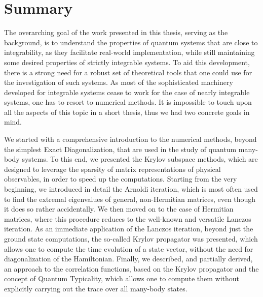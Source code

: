 \chapter{Summary}
\thispagestyle{chapterBeginStyle}


The overarching goal of the work presented in this thesis, serving as the background, is to understand the properties of
quantum systems that are close to integrability, as they facilitate real-world implementation, while
still maintaining some desired properties of strictly integrable systems.
To aid this development, there is a strong need for a robust set of theoretical tools that one
could use for the investigation of such systems. As most of the sophisticated machinery developed
for integrable systems cease to work for the case of nearly integrable systems, one has
to resort to numerical methods. It is impossible to touch upon all the aspects of this
topic in a short thesis, thus we had two concrete goals in mind.

We started with a comprehensive introduction to the numerical methods, beyond the simplest Exact
Diagonalization, that are used in the study of quantum many-body systems. To this end, we presented
the Krylov subspace methods, which are designed to leverage the sparsity of matrix representations of
physical observables, in order to speed up the computations. Starting from the very beginning, we
introduced in detail the Arnoldi iteration, which is most often used to find the extremal eigenvalues
of general, non-Hermitian matrices, even though it does so rather accidentally. We then moved on to
the case of Hermitian matrices, where this procedure reduces to the well-known and versatile
Lanczos iteration. As an immediate application of the Lanczos iteration, beyond just the ground state
computations, the so-called Krylov propagator was presented, which allows one to compute the time evolution of
a state vector, without the need for diagonalization of the Hamiltonian. Finally, we described,
and partially derived, an approach to the correlation functions, based on the Krylov
propagator and the concept of Quantum Typicality, which allows one to compute them
without explicitly carrying out the trace over all many-body states.

